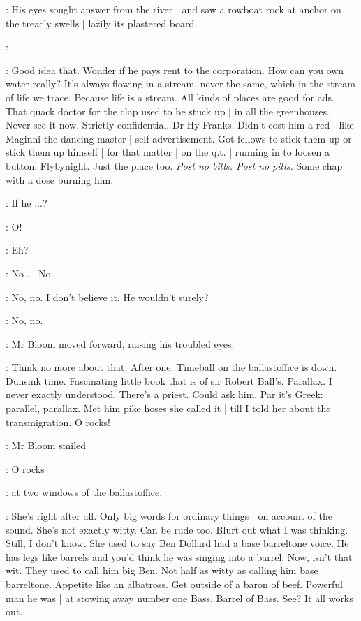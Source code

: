 :
His eyes sought answer from the river |
and saw a rowboat rock at anchor on the treacly swells |
lazily its plastered board.

:


\BloomInt:
Good idea that.
Wonder if he pays rent to the corporation.
How can you own water really?
It's always flowing in a stream,
never the same,
which in the stream of life we trace.
Because life is a stream.
All kinds of places are good for ads.
That quack doctor for the clap used to be stuck up |
in all the greenhouses.
Never see it now.
Strictly confidential.
Dr Hy Franks.
Didn't cost him a red |
like Maginni the dancing master |
self advertisement.
Got fellows to stick them up
or stick them up himself |
for that matter |
on the q.t. |
running in to loosen a button.
Flybynight.
Just the place too.
\emph{Post no bills.
Post no pills.}
Some chap with a dose burning him.

\BloomInt:
If he ...?

\BloomInt:
O!

\BloomInt:
Eh?

\BloomInt:
No ...
No.

\BloomInt:
No, no.
I don't believe it.
He wouldn't surely?

\BloomInt:
No, no.

:
Mr Bloom moved forward, raising his troubled eyes.

\BloomInt:
Think no more about that.
After one.
Timeball on the ballastoffice is down.
Dunsink time.
Fascinating little book that is of sir Robert Ball's.
Parallax.
I never exactly understood.
There's a priest.
Could ask him.
Par it's Greek:
parallel, parallax.
Met him pike hoses she called it |
till I told her about the transmigration.
O rocks!

:
Mr Bloom smiled

\BloomInt:
O rocks

:
at two windows of the ballastoffice.

\BloomInt:
She's right after all.
Only big words for ordinary things |
on account of the sound.
She's not exactly witty.
Can be rude too.
Blurt out what I was thinking.
Still, I don't know.
She used to say Ben Dollard had a base barreltone voice.
He has legs like barrels and you'd think he was singing into a barrel.
Now, isn't that wit.
They used to call him big Ben.
Not half as witty as calling him base barreltone.
Appetite like an albatross.
Get outside of a baron of beef.
Powerful man he was |
at stowing away number one Bass.
Barrel of Bass.
See?
It all works out.

